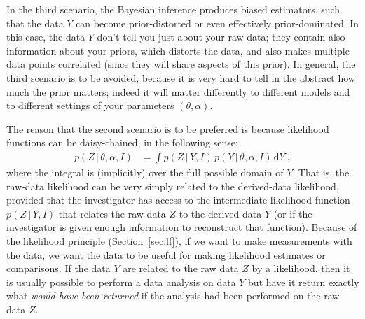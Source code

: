 \documentclass{article}
\newcommand{\sectionname}{Section}
\newcommand{\secref}[1]{\sectionname~\ref{#1}}
\newcommand{\dd}{\mathrm{d}}
\newcommand{\given}{\,|\,}
\begin{document}
In the third scenario, the Bayesian inference produces biased estimators, such that the data $Y$ can become prior-distorted or even effectively prior-dominated.
In this case, the data $Y$ don’t tell you just about your raw data; they contain also information about your priors, which distorts the data, and also makes multiple data points correlated (since they will share aspects of this prior).
In general, the third scenario is to be avoided, because it is very hard to tell in the abstract how much the prior matters; indeed it will matter differently to different models and to different settings of your parameters $(\theta,\alpha)$.

The reason that the second scenario is to be preferred is because likelihood functions can be daisy-chained, in the following sense:
\begin{align}
    p(Z\given\theta,\alpha,I) &= \int p(Z\given Y,I)\,p(Y\given\theta,\alpha,I)\,\dd Y~,
\end{align}
where the integral is (implicitly) over the full possible domain of $Y$.
That is, the raw-data likelihood can be very simply related to the derived-data likelihood, provided that the investigator has access to the intermediate likelihood function $p(Z\given Y,I)$ that relates the raw data $Z$ to the derived data $Y$ (or if the investigator is given enough information to reconstruct that function).
Because of the likelihood principle (\secref{sec:lf}), if we want to make measurements with the data, we want the data to be useful for making likelihood estimates or comparisons.
If the data $Y$ are related to the raw data $Z$ by a likelihood, then it is usually possible to perform a data analysis on data $Y$ but have it return exactly what \emph{would have been returned} if the analysis had been performed on the raw data $Z$.
\end{document}
